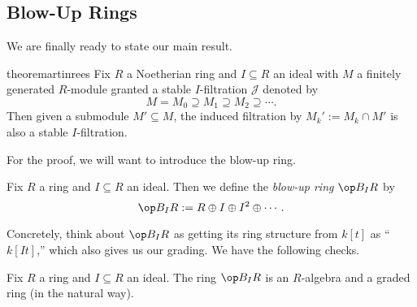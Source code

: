 \subsection{Blow-Up Rings}
We are finally ready to state our main result.
\begin{restatable}{theorem}{artinrees} \label{thm:artinrees}
	Fix $R$ a Noetherian ring and $I\subseteq R$ an ideal with $M$ a finitely generated $R$-module granted a stable $I$-filtration $\mathcal J$ denoted by
	\[M=M_0\supseteq M_1\supseteq M_2\supseteq\cdots.\]
	Then given a submodule $M'\subseteq M$, the induced filtration by $M_k':=M_k\cap M'$ is also a stable $I$-filtration.
\end{restatable}
\noindent For the proof, we will want to introduce the blow-up ring.
\begin{definition}
	Fix $R$ a ring and $I\subseteq R$ an ideal. Then we define the \textit{blow-up ring} $\op B_IR$ by
	\[\op B_IR:=R\oplus I\oplus I^2\oplus\cdots.\]
\end{definition}
Concretely, think about $\op B_IR$ as getting its ring structure from $k[t]$ as ``$k[It]$,'' which also gives us our grading. We have the following checks.
\begin{lem}
	Fix $R$ a ring and $I\subseteq R$ an ideal. The ring $\op B_IR$ is an $R$-algebra and a graded ring (in the natural way).
\end{lem}
